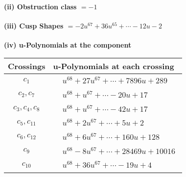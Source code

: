 \documentclass[1p]{elsarticle_modified}
\theoremstyle{definition}
\begin{document}
\flushleft \textbf{(ii) Obstruction class $= -1$}\\~\\
\flushleft \textbf{(iii) Cusp Shapes $= -2 u^{67}+36 u^{65}+\cdots-12 u-2$}\\~\\
\newpage\renewcommand{\arraystretch}{1}
\flushleft \textbf{(iv) u-Polynomials at the component}\newline \\
\begin{tabular}{m{50pt}|m{274pt}}
Crossings & \hspace{64pt}u-Polynomials at each crossing \\
\hline $$\begin{aligned}c_{1}\end{aligned}$$&$\begin{aligned}
&u^{68}+27 u^{67}+\cdots+7896 u+289
\end{aligned}$\\
\hline $$\begin{aligned}c_{2},c_{7}\end{aligned}$$&$\begin{aligned}
&u^{68}+u^{67}+\cdots-20 u+17
\end{aligned}$\\
\hline $$\begin{aligned}c_{3},c_{4},c_{8}\end{aligned}$$&$\begin{aligned}
&u^{68}+u^{67}+\cdots-42 u+17
\end{aligned}$\\
\hline $$\begin{aligned}c_{5},c_{11}\end{aligned}$$&$\begin{aligned}
&u^{68}+2 u^{67}+\cdots+5 u+2
\end{aligned}$\\
\hline $$\begin{aligned}c_{6},c_{12}\end{aligned}$$&$\begin{aligned}
&u^{68}+6 u^{67}+\cdots+160 u+128
\end{aligned}$\\
\hline $$\begin{aligned}c_{9}\end{aligned}$$&$\begin{aligned}
&u^{68}-8 u^{67}+\cdots+28469 u+10016
\end{aligned}$\\
\hline $$\begin{aligned}c_{10}\end{aligned}$$&$\begin{aligned}
&u^{68}+36 u^{67}+\cdots-19 u+4
\end{aligned}$\\
\hline
\end{tabular}\\~\\
\end{document}
